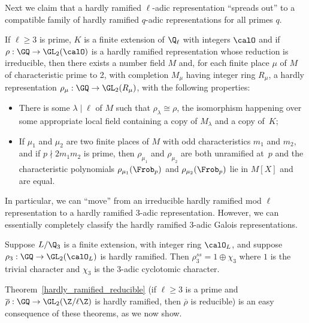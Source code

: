 Next we claim that a hardly ramified $\ell$-adic representation ``spreads out'' to a compatible
family of hardly ramified $q$-adic representations for all primes $q$.

\begin{theorem}
  \label{hardly-ramified-spreads-out}
  If $\ell\geq3$ is prime, $K$ is a finite extension of $\Q_\ell$
  with integers $\calO$ and if $\rho:\GQ\to\GL_2(\calO)$ is a hardly ramified representation
  whose reduction is irreducible,
  then there exists a number field $M$ and, for each finite place $\mu$ of $M$
  of characteristic prime to 2, with completion $M_\mu$ having integer ring $R_\mu$,
  a hardly representation $\rho_\mu:\GQ\to\GL_2(R_\mu)$, with the following properties:
  \begin{itemize}
    \item There is some $\lambda\mid\ell$ of $M$ such that $\rho_\lambda\cong\rho$,
      the isomorphism happening over some appropriate local field containing a copy
      of $M_\lambda$ and a copy of~$K$;
    \item If $\mu_1$ and $\mu_2$ are two finite places of $M$ with odd characteristics $m_1$
      and $m_2$, and if $p\nmid 2m_1m_2$ is prime, then $\rho_{\mu_1}$ and $\rho_{\mu_2}$
      are both unramified at~$p$ and the characteristic polynomials $\rho_{\mu_1}(\Frob_p)$
      and $\rho_{\mu_2}(\Frob_p)$ lie in $M[X]$ and are equal.
  \end{itemize}
\end{theorem}

In particular, we can ``move'' from an irreducible hardly ramified mod $\ell$ representation
to a hardly ramified 3-adic representation.
However, we can essentially completely classify the hardly ramified 3-adic Galois representations.

\begin{theorem}
  \label{hardly-ramified-3adic-reducible}
  Suppose $L/\Q_3$ is a finite extension, with integer ring $\calO_L$, and suppose
  $\rho_3:\GQ\to\GL_2(\calO_L)$ is hardly ramified. Then $\rho_3^{ss}=1\oplus\chi_3$
  where $1$ is the trivial character and $\chi_3$ is the 3-adic cyclotomic character.
\end{theorem}

Theorem~\ref{hardly_ramified_reducible} (if $\ell\geq 3$ is a prime and
$\overline{\rho}:\GQ\to\GL_2(\Z/\ell\Z)$ is hardly ramified,
then $\overline{\rho}$ is reducible) is an easy consequence of these theorems,
as we now show.

